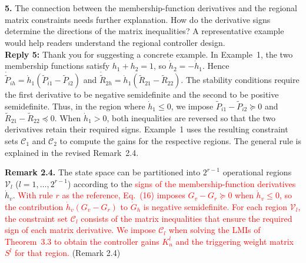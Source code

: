 \documentclass[10pt,fleqn]{article}
\begin{document}
~\\
\\
\textbf{5.} The connection between the membership-function derivatives and the regional matrix constraints needs further explanation. How do the derivative signs determine the directions of the matrix inequalities? A representative example would help readers understand the regional controller design.
\\[10pt]
\begingroup
\setlength{\parskip}{6pt}
\indent \textbf{Reply 5:} Thank you for suggesting a concrete example. In Example~1, the two membership functions satisfy $h_1+h_2=1$, so $\dot h_2=-\dot h_1$. Hence $\dot{\widetilde P}_{ih}=\dot h_1(\widetilde P_{i1}-\widetilde P_{i2})$ and $\dot{\widetilde R}_{2h}=\dot h_1(\widetilde R_{21}-\widetilde R_{22})$. The stability conditions require the first derivative to be negative semidefinite and the second to be positive semidefinite. Thus, in the region where $\dot h_1\leq 0$, we impose $\widetilde P_{i1}-\widetilde P_{i2}\succeq 0$ and $\widetilde R_{21}-\widetilde R_{22}\preceq 0$. When $\dot h_1>0$, both inequalities are reversed so that the two derivatives retain their required signs. Example~1 uses the resulting constraint sets $\mathcal C_1$ and $\mathcal C_2$ to compute the gains for the respective regions. The general rule is explained in the revised Remark~2.4.\par
\noindent \textbf{Remark 2.4.} The state space can be partitioned into $2^{r-1}$ operational regions $\mathcal{V}_l$ ($l = 1,\ldots,2^{r-1}$) according to the \textcolor{red}{signs of the membership-function derivatives} $\dot{h}_v$. \textcolor{red}{With rule $r$ as the reference, Eq.~(16) imposes $G_v-G_r\succeq 0$ when $\dot h_v\leq 0$, so the contribution $\dot h_v(G_v-G_r)$ to $\dot G_h$ is negative semidefinite. For each region $\mathcal V_l$, the constraint set $\mathcal C_l$ consists of the matrix inequalities that ensure the required sign of each matrix derivative. We impose $\mathcal C_l$ when solving the LMIs of Theorem~3.3 to obtain the controller gains $K_n^l$ and the triggering weight matrix $S^l$ for that region.} (Remark 2.4)\par
\endgroup
\end{document}

